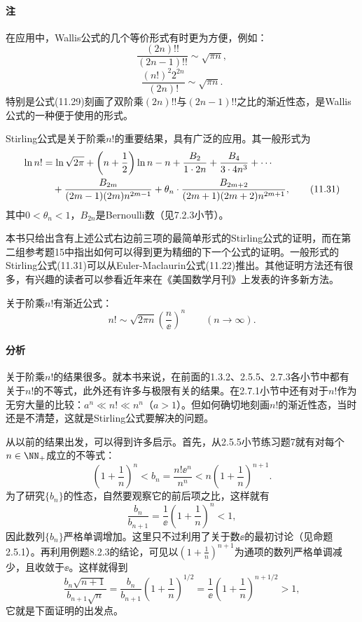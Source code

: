 \paragraph{注} 在应用中，Wallis公式的几个等价形式有时更为方便，例如：
\begin{equation}
  \frac{(2n)!!}{(2n-1)!!}\sim\sqrt{\pi n},
  \tag{11.29}
  \label{eq:11.29}
\end{equation}
\begin{equation}
  \frac{(n!)^2 2^{2n}}{(2n)!}\sim\sqrt{\pi n}.
  \tag{11.30}
  \label{eq:11.30}
\end{equation}
特别是公式(11.29)刻画了双阶乘$(2n)!!$与$(2n-1)!!$之比的渐近性态，是Wallis公式的一种便于使用的形式。

Stirling公式是关于阶乘$n!$的重要结果，具有广泛的应用。其一般形式为
\begin{align}
\ln n!&=\ln\sqrt{2\pi}+\left(n+\frac12\right)\ln n-n
+\frac{B_2}{1\cdot2n}+\frac{B_4}{3\cdot4n^3}+\cdots\notag\\
&\quad+\frac{B_{2m}}{(2m-1)(2m)n^{2m-1}}
+\theta_n\cdot\frac{B_{2m+2}}{(2m+1)(2m+2)n^{2m+1}},
\tag{11.31}
\label{eq:11.31}
\end{align}
其中$0<\theta_n<1$，$B_{2n}$是Bernoulli数（见7.2.3小节）。

本书只给出含有上述公式右边前三项的最简单形式的Stirling公式的证明，而在第二组参考题15中指出如何可以得到更为精细的下一个公式的证明。一般形式的Stirling公式(11.31)可以从Euler-Maclaurin公式(11.22)推出。其他证明方法还有很多，有兴趣的读者可以参看近年来在《美国数学月刊》上发表的许多新方法。

\begin{xproposition}[11.4.2（最简单形式的Stirling公式）]
关于阶乘$n!$有渐近公式：
\begin{equation}
  n!\sim\sqrt{2\pi n}\left(\frac n\ee\right)^n\qquad(n\to\infty).
  \tag{11.32}
  \label{eq:11.32}
\end{equation}
\end{xproposition}

\paragraph{分析} 关于阶乘$n!$的结果很多。就本书来说，在前面的1.3.2、2.5.5、2.7.3各小节中都有关于$n!$的不等式，此外还有许多与极限有关的结果。在2.7.1小节中还有对于$n!$作为无穷大量的比较：$a^n\ll n!\ll n^n$（$a>1$）。但如何确切地刻画$n!$的渐近性态，当时还是不清楚，这就是Stirling公式要解决的问题。

从以前的结果出发，可以得到许多启示。首先，从2.5.5小节练习题7就有对每个$n\in\NN_+$成立的不等式：
\[
  \left(1+\frac1n\right)^n<b_n=\frac{n!\ee^n}{n^n}
  <n\left(1+\frac1n\right)^{n+1}.
\]
为了研究$\{b_n\}$的性态，自然要观察它的前后项之比，这样就有
\[
  \frac{b_n}{b_{n+1}}=\frac1\ee\left(1+\frac1n\right)^n<1,
\]
因此数列$\{b_n\}$严格单调增加。这里只不过利用了关于数$\ee$的最初讨论（见命题2.5.1）。再利用例题8.2.3的结论，可见以$\left(1+\frac1n\right)^{n+1}$为通项的数列严格单调减少，且收敛于$\ee$。这样就得到
\[
  \frac{b_n\sqrt{n+1}}{b_{n+1}\sqrt n}
  =\frac{b_n}{b_{n+1}}\left(1+\frac1n\right)^{1/2}
  =\frac1\ee\left(1+\frac1n\right)^{n+1/2}>1,
\]
它就是下面证明的出发点。

